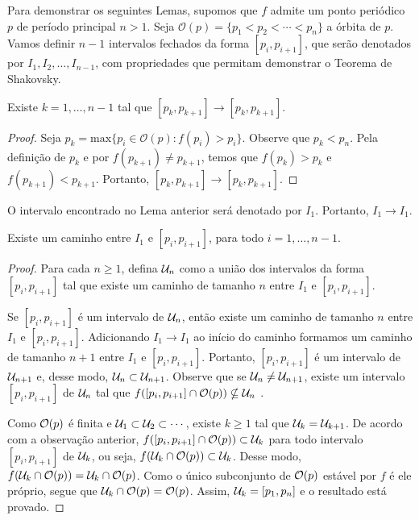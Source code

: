 Para demonstrar os seguintes Lemas, supomos que $f$ admite um ponto periódico $p$ de período principal $n > 1$. Seja $\mathcal{O}(p) = \{p_1 < p_2 < \cdots < p_n\}$ a órbita de $p$. Vamos definir $n-1$ intervalos fechados da forma $[p_i, p_{i+1}]$, que serão denotados por $I_1, I_2, \dots, I_{n-1}$, com propriedades que permitam demonstrar o Teorema de Shakovsky.

\begin{lemma}
Existe $k = 1, \dots, n-1$ tal que $[p_k, p_{k+1}] \longrightarrow [p_k, p_{k+1}]$.
\end{lemma}

\begin{proof}
Seja $p_k = \textrm{max}\{p_i \in \mathcal{O}(p) : f(p_i) > p_i\}$. Observe que $p_k < p_n$. Pela definição de $p_k$ e por $f(p_{k+1}) \neq p_{k+1}$, temos que $f(p_k) > p_k$ e $f(p_{k+1}) < p_{k+1}$. Portanto, $[p_k, p_{k+1}] \longrightarrow [p_k, p_{k+1}]$.
\end{proof}

O intervalo encontrado no Lema anterior será denotado por $I_1$. Portanto, $I_1 \longrightarrow I_1$.

\begin{lemma}
Existe um caminho entre $I_1$ e $[p_i, p_{i+1}]$, para todo $i = 1, \dots, n-1$.
\end{lemma}

\begin{proof}
Para cada $n \geq 1$, defina $\mathcal{U}_n$ como a união dos intervalos da forma $[p_i, p_{i+1}]$ tal que existe um caminho de tamanho $n$ entre $I_1$ e $[p_i, p_{i+1}]$.

Se $[p_i, p_{i+1}]$ é um intervalo de $\mathcal{U}_n$, então existe um caminho de tamanho $n$ entre $I_1$ e $[p_i, p_{i+1}]$. Adicionando $I_1 \longrightarrow I_1$ ao início do caminho formamos um caminho de tamanho $n+1$ entre  $I_1$ e $[p_i, p_{i+1}]$. Portanto, $[p_i, p_{i+1}]$ é um intervalo de $\mathcal{U}_{n+1}$ e, desse modo, $\mathcal{U}_n \subset \mathcal{U}_{n+1}$. Observe que se $\mathcal{U}_n \neq \mathcal{U}_{n+1}$, existe um intervalo  $[p_i, p_{i+1}]$ de $\mathcal{U}_n$ tal que $f([p_i, p_{i+1}] \cap \mathcal{O}(p)) \nsubseteq \mathcal{U}_n$ .

Como $\mathcal{O}(p)$ é finita e $\mathcal{U}_1 \subset \mathcal{U}_2 \subset \cdots$, existe $k \geq 1$ tal que $\mathcal{U}_k = \mathcal{U}_{k+1}$. De acordo com a observação anterior, $f([p_i, p_{i+1}] \cap \mathcal{O}(p)) \subset \mathcal{U}_k$ para todo intervalo $[p_i, p_{i+1}]$ de $\mathcal{U}_k$, ou seja, $f(\mathcal{U}_k \cap \mathcal{O}(p)) \subset \mathcal{U}_k$. Desse modo, $f(\mathcal{U}_k \cap \mathcal{O}(p)) = \mathcal{U}_k \cap \mathcal{O}(p)$. Como o único subconjunto de $\mathcal{O}(p)$ estável por $f$ é ele próprio, segue que $\mathcal{U}_k \cap \mathcal{O}(p) = \mathcal{O}(p)$. Assim, $\mathcal{U}_k = [p_1, p_n]$ e o resultado está provado.
\end{proof}

